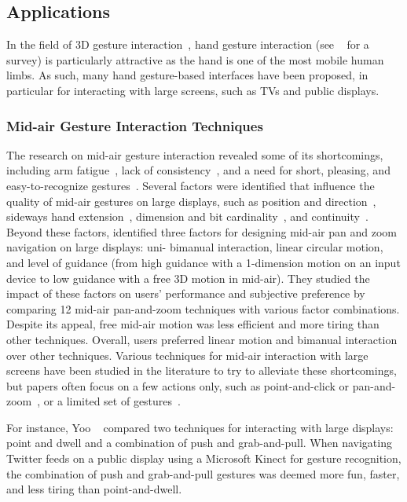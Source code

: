 \subsection{Applications} \label{sec:state_of_the_art:overview:applications}
In the field of 3D gesture interaction~\cite{LaViola:2013,Koutsabasis:2019}, hand gesture interaction (see ~\cite{Cheng:2016} for a survey) is particularly attractive as the hand is one of the most mobile human limbs. As such, many hand gesture-based interfaces have been proposed, in particular for interacting with large screens, such as TVs and public displays.

\subsubsection{Mid-air Gesture Interaction Techniques}
The research on mid-air gesture interaction revealed some of its shortcomings, including arm fatigue~\cite{Gupta:2017}, lack of consistency~\cite{Groenewald:2016}, and a need for short, pleasing, and easy-to-recognize gestures~\cite{Kohlsdorf:2013}. 
%
Several factors were identified that influence the quality of mid-air gestures on large displays, such as position and direction~\cite{Fruchard:2018}, sideways hand extension~\cite{Koutsabasis:2016}, dimension and bit cardinality~\cite{Vatavu:2013}, and continuity~\cite{Kohlsdorf:2013}. Beyond these factors, \cite{Nancel:2011} identified three factors for designing mid-air pan and zoom navigation on large displays: uni- \vs bimanual interaction, linear \vs circular motion, and level of guidance (from high guidance with a 1-dimension motion on an input device to low guidance with a free 3D motion in mid-air). They studied the impact of these factors on users' performance and subjective preference by comparing 12 mid-air pan-and-zoom techniques with various factor combinations. Despite its appeal, free mid-air motion was less efficient and more tiring than other techniques. Overall, users preferred linear motion and bimanual interaction over other techniques.
%
Various techniques for mid-air interaction with large screens have been studied in the literature to try to alleviate these shortcomings, but papers often focus on a few actions only, such as point-and-click or pan-and-zoom~\cite{Nacenta:2013}, or a limited set of gestures~\cite{Groenewald:2016}.

For instance, Yoo \etal~\cite{Yoo:2015} compared two techniques for interacting with large displays: point and dwell and a combination of push and grab-and-pull. When navigating Twitter feeds on a public display using a Microsoft Kinect for gesture recognition, the combination of push and grab-and-pull gestures was deemed more fun, faster, and less tiring than point-and-dwell.

